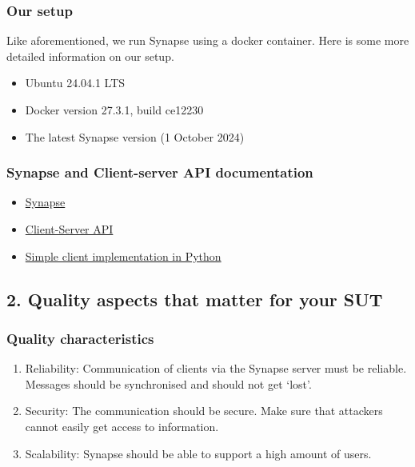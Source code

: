 \documentclass{article}
\begin{document}
\subsubsection*{Our setup}
Like aforementioned, we run Synapse using a docker container. Here is some more detailed information on our setup.
\begin{itemize}
    \item Ubuntu 24.04.1 LTS
    \item Docker version 27.3.1, build ce12230
    \item The latest Synapse version (1 October 2024)
\end{itemize}

\subsubsection*{Synapse and Client-server API documentation}
\begin{itemize}
    \item \href{https://github.com/matrix-org/synapse}{Synapse}
    \item \href{https://spec.matrix.org/latest/client-server-api/}{Client-Server API}
    \item \href{https://uhoreg.gitlab.io/matrix-tutorial/}{Simple client implementation in Python}
\end{itemize}

\subsection*{2. Quality aspects that matter for your SUT}
\subsubsection*{Quality characteristics}
\begin{enumerate}
    \item Reliability: Communication of clients via the Synapse server must be reliable. Messages should be synchronised and should not get `lost'.
    \item Security: The communication should be secure. Make sure that attackers cannot easily get access to information.
    \item Scalability: Synapse should be able to support a high amount of users.
\end{enumerate}
\end{document}
